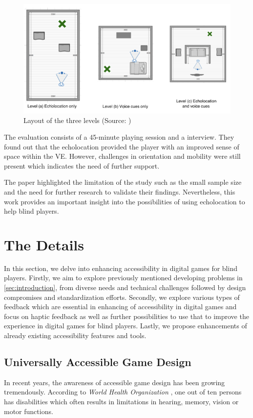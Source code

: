 \documentclass[sigconf,natbib=false,10pt]{acmart}
\begin{document}
	\begin{figure}[ht]
		\centering
		\includegraphics[scale=0.5]{assets/echo-house-layout.png}
		\caption{Layout of the three levels (Source: \textcite{andrade_echo-house_2018})}
		\label{fig:echo-house-layout}
	\end{figure}

	The evaluation consists of a 45-minute playing session and a interview.
	They found out that the echolocation provided the player with an improved sense of space within the VE.
	However, challenges in orientation and mobility were still present which indicates the need of further support.
	
	The paper highlighted the limitation of the study such as the small sample size and the need for further research to validate their findings.
	Nevertheless, this work provides an important insight into the possibilities of using echolocation to help blind players.
	
	\section{The Details} \label{sec:theDetails}
	In this section, we delve into enhancing accessibility in digital games for blind players.
	Firstly, we aim to explore previously mentioned developing problems in \autoref{sec:introduction}, from diverse needs and technical challenges followed by design compromises and standardization efforts.
	Secondly, we explore various types of feedback which are essential in enhancing of accessibility in digital games and focus on haptic feedback as well as further possibilities to use that to improve the experience in digital games for blind players.
	Lastly, we propose enhancements of already existing accessibility features and tools.
	
	\subsection{Universally Accessible Game Design} \label{subsec:uagd}
	In recent years, the awareness of accessible game design has been growing tremendously.
	According to \emph{World Health Organization} \cite{world_health_organization_international_2004}, one out of ten persons has disabilities which often results in limitations in hearing, memory, vision or motor functions.
	
\end{document}
